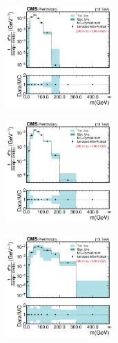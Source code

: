       \begin{figure}[htp!]
	\centering
	\begin{subfigure}
          \centering
          \includegraphics[width=0.45\textwidth]{figures/multijet/unfolding/dijet/closure_binnedResult_ungroomed_0.pdf}
        \end{subfigure}%
        \begin{subfigure}
          \centering
          \includegraphics[width=0.45\textwidth]{figures/multijet/unfolding/dijet/closure_binnedResult_ungroomed_1.pdf}
        \end{subfigure}%
        \begin{subfigure}
          \centering
          \includegraphics[width=0.45\textwidth]{figures/multijet/unfolding/dijet/closure_binnedResult_ungroomed_2.pdf}
        \end{subfigure}%
        \begin{subfigure}

\end{subfigure}
\end{figure}

